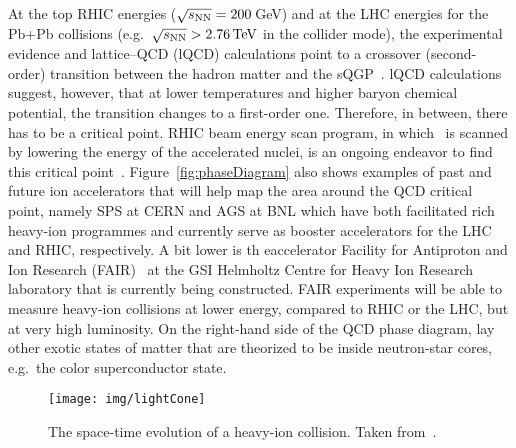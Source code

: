 At the top RHIC energies ($\sqrt{s_\text{NN}} = 200\,$GeV) and at the LHC energies for the Pb+Pb collisions (e.g.\ $\snn > \SI{2.76}{\tera\electronvolt}$ in the collider mode), the experimental evidence and lattice--QCD (lQCD) calculations point to a crossover (second-order) transition between the hadron matter and the sQGP~\cite{SumberaPasechnik}\@. lQCD calculations suggest, however, that at lower temperatures and higher baryon chemical potential, the transition changes to a first-order one. Therefore, in between, there has to be a critical point. RHIC beam energy scan program, in which \snn\ is scanned by lowering the energy of the accelerated nuclei, is an ongoing endeavor to find this critical point~\cite{BESII}\@. Figure~\ref{fig:phaseDiagram} also shows examples of past and future ion accelerators that will help map the area around the QCD critical  point, namely SPS at CERN and AGS at BNL which have both facilitated rich heavy-ion programmes and currently serve as booster accelerators for the LHC and RHIC, respectively. A bit lower is th eaccelerator Facility for Antiproton and Ion Research (FAIR)~\cite{FAIR} at the GSI Helmholtz Centre for Heavy Ion Research laboratory that is currently being constructed. FAIR experiments will be able to measure heavy-ion collisions at lower energy, compared to RHIC or the LHC, but at very high luminosity. On the right-hand side of the QCD phase diagram, lay other exotic states of matter that are theorized to be inside neutron-star cores, e.g.\ the color superconductor state. 

\begin{figure}[!htb]
\centering
\texttt{[image: img/lightCone]}
\caption[The space-time evolution of a heavy-ion collision.]{The space-time evolution of a heavy-ion collision. Taken from~\cite{helen}.}
\label{fig:lightCone}
\end{figure}


